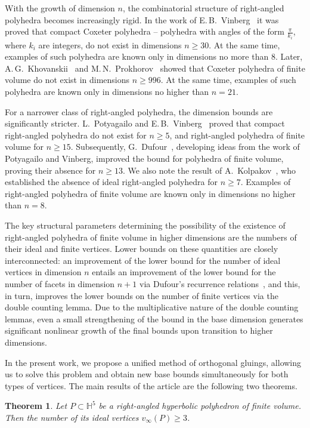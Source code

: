 \documentclass[12pt]{amsart}
\newtheorem{theorem}{Theorem}[section]
\theoremstyle{definition}
\begin{document}
	With the growth of dimension $n$, the combinatorial structure of right-angled polyhedra becomes increasingly rigid. In the work of E.\,B.~Vinberg~\cite{Vin84} it was proved that compact Coxeter polyhedra -- polyhedra with angles of the form $\tfrac{\pi}{k_i}$, where $k_i$ are integers, do not exist in dimensions $n \ge 30$. At the same time, examples of such polyhedra are known only in dimensions no more than 8. Later, A.\,G.~Khovanskii~\cite{Kho86} and M.\,N.~Prokhorov~\cite{Pr86} showed that Coxeter polyhedra of finite volume do not exist in dimensions $n \ge 996$. At the same time, examples of such polyhedra are known only in dimensions no higher than $n = 21$.
	
	For a narrower class of right-angled polyhedra, the dimension bounds are significantly stricter. L.~Potyagailo and E.\,B.~Vinberg~\cite{PV05} proved that compact right-angled polyhedra do not exist for $n \ge 5$, and right-angled polyhedra of finite volume for $n \geq 15$. Subsequently, G.~Dufour~\cite{Dufour2010}, developing ideas from the work of Potyagailo and Vinberg, improved the bound for polyhedra of finite volume, proving their absence for $n \geq 13$. We also note the result of A.~Kolpakov~\cite{Ko2012}, who established the absence of ideal right-angled polyhedra for $n \geq 7$. Examples of right-angled polyhedra of finite volume are known only in dimensions no higher than $n = 8$.
	
	The key structural parameters determining the possibility of the existence of right-angled polyhedra of finite volume in higher dimensions are the numbers of their ideal and finite vertices. Lower bounds on these quantities are closely interconnected: an improvement of the lower bound for the number of ideal vertices in dimension $n$ entails an improvement of the lower bound for the number of facets in dimension $n+1$ via Dufour's recurrence relations~\cite{Dufour2010}, and this, in turn, improves the lower bounds on the number of finite vertices via the double counting lemma. Due to the multiplicative nature of the double counting lemmas, even a small strengthening of the bound in the base dimension generates significant nonlinear growth of the final bounds upon transition to higher dimensions.
	
	In the present work, we propose a unified method of orthogonal gluings, allowing us to solve this problem and obtain new base bounds simultaneously for both types of vertices. The main results of the article are the following two theorems.
	
	\begin{theorem} \label{thm:main_ideal_intro}
		Let $P \subset \mathbb{H}^5$ be a right-angled hyperbolic polyhedron of finite volume. Then the number of its ideal vertices $v_\infty(P) \ge 3$. 
	\end{theorem}
	
\end{document}
